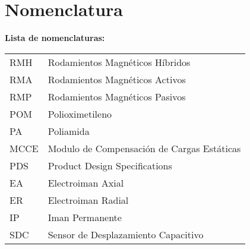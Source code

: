 \chapter{Nomenclatura}

\textbf{Lista de nomenclaturas:}\\


\begin{tabular}{ll}
	RMH\hspace{3cm} & Rodamientos Magn\'eticos H\'ibridos\\
	RMA\hspace{3cm} & Rodamientos Magn\'eticos Activos\\
	RMP\hspace{3cm} & Rodamientos Magn\'eticos Pasivos\\
	POM\hspace{3cm} & Polioximetileno \\
	PA\hspace{3cm} & Poliamida\\
	MCCE\hspace{3cm} & Modulo de Compensaci\'on de Cargas Est\'aticas\\
	PDS\hspace{3cm} & Product Design Specifications\\ 
	EA\hspace{3cm} & Electroiman Axial\\
	ER\hspace{3cm} & Electroiman Radial\\
	IP\hspace{3cm} & Iman Permanente\\
	SDC\hspace{3cm} & Sensor de Desplazamiento Capacitivo\\
\end{tabular}

